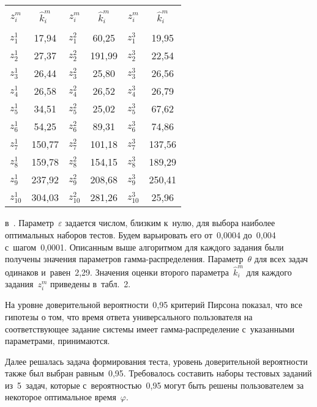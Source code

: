 \begin{multicols}{2}
{\begin{center}
    \small
     \begin{tabular}{|l|c|l|c|l|c|}
     \hline
     &&&&&\\[-9pt]
     \multicolumn{1}{|c|}{$z_i^m$}&$\hat{k}_i^m$&
          \multicolumn{1}{|c}{$z_i^m$}&$\hat{k}_i^m$&
               \multicolumn{1}{c|}{$z_i^m$}&$\hat{k}_i^m$\\
\hline
&&&&&\\[-9pt]
$z_1^1$&17,94&$z^2_1$&60,25&$z_1^3$&19,95\\
$z_2^1$&27,37&$z^2_2$&191,99\hphantom{9}&$z_2^3$&22,54 \\
$z_3^1$&26,44&$z^2_3$&25,80 &$z_3^3$&26,56 \\
$z_4^1$&26,58&$z_4^2$&26,52&$z_4^3$&26,79\\
$z_5^1$&34,51&$z_5^2$&25,02&$z_5^3$&67,62 \\
$z_6^1$&54,25&$z_6^2$&89,31&$z_6^3$&74,86 \\
$z_7^1$&150,77\hphantom{9}&$z_7^2$&101,18\hphantom{9}&$z^3_7$&137,56\hphantom{9}\\
$z_8^1$&159,78\hphantom{9}&$z^2_8$&154,15\hphantom{9}&$z_8^3$&189,29\hphantom{9}\\
$z_9^1$&237,92\hphantom{9}&$z_9^2$&208,68\hphantom{9}&$z_9^3$&250,41\hphantom{9}\\
$z^1_{10}$&304,03\hphantom{9}&$z^2_{10}$&281,26\hphantom{9}&$z^3_{10}$&25,96\\
\hline
\end{tabular}
\end{center}}

\vspace*{12pt}

\noindent
 в~\cite{8-b, 9-b}. 
Параметр~$\varepsilon$ задается числом, близким к~нулю, для выбора наиболее 
оптимальных наборов тестов. Будем варьировать его от~0,0004 до~0,004 
с~шагом~0,0001. Описанным выше алгоритмом для каждого задания были 
получены значения па\-ра\-мет\-ров гам\-ма-рас\-пре\-де\-ле\-ния. Параметр~$\theta$ 
для всех задач одинаков и~равен~2,29. Значения оценки второго 
параметра~$\hat{k}_i^m$ для каждого задания~$z_i^m$ приведены в~табл.~2. 
    
  
    
    На уровне доверительной вероятности~0,95 критерий Пирсона показал, 
что все гипотезы о том, что время ответа универсального пользователя на 
соответствующее задание системы имеет гам\-ма-рас\-пре\-де\-ле\-ние 
с~указанными параметрами, принимаются.
    
    Далее решалась задача формирования теста, уровень доверительной 
вероятности также был выбран равным~0,95. Требовалось составить наборы 
тестовых заданий из~5~задач, которые с~вероятностью~0,95 могут быть 
решены пользователем за некоторое оптимальное время~$\varphi$.
    

\end{multicols}
